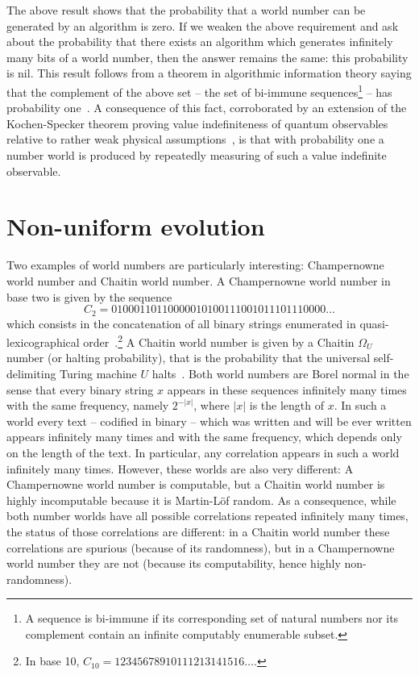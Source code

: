 \documentclass[12pt]{article}
\begin{document}
The above result shows that the probability that a world
number can be generated by an algorithm is zero.
If we weaken the  above requirement and ask about the probability that
there exists an algorithm which generates  infinitely many bits of a world number,
then the answer remains the same: this probability is nil.
This result follows from a theorem
in algorithmic information theory saying that the complement
of the above set -- the set of  bi-immune sequences\footnote{
A sequence  is bi-immune if  its corresponding set of natural numbers nor its complement contain an infinite computably enumerable subset.}
 --
has probability one~\cite{calude:02}. A consequence of this fact,
corroborated   by   an extension of the Kochen-Specker theorem
proving value indefiniteness of quantum observables
relative to rather weak physical assumptions~\cite{vi-aeverywhere-2014}, is that
with probability one a  number world is produced by repeatedly measuring of such a value indefinite observable.



\section{Non-uniform evolution}
\label{2018-was-sectnue}
 Two examples of world numbers are particularly interesting:  Champernowne world number and Chaitin world number. A Champernowne world number in base two is given by the sequence $$C_2=01000110110000010100111001011101110000\dots $$ which consists in the concatenation of all binary strings enumerated in quasi-lexicographical order~\cite{DGC1933}.\footnote{In base 10, $C_{10} = 12345678910111213141516\dots$.}  A Chaitin world number is given by a Chaitin $\Omega_U$ number (or halting probability),  that
is the probability that the universal self-delimiting Turing machine  $U$ halts~\cite{rtx100200236p}. Both
world numbers are Borel normal in the sense that every binary string $x$ appears in these sequences infinitely many times with the same frequency, namely
$2^{-|x|}$, where $|x|$ is the length of $x$.
 In such a world every text -- codified in binary -- which was written and will be ever written appears infinitely many times and with the same frequency,  which depends only on the length of the text. In particular, any correlation appears in such a world infinitely many times. However, these worlds are also very different: A Champernowne world number is computable, but a Chaitin world number is highly incomputable because it is Martin-L\"of random. As a consequence, while both number worlds  have all possible correlations repeated infinitely many times, the status of those correlations are different: in a Chaitin world number these correlations are spurious (because of its randomness), but in a Champernowne world number they are not (because  its  computability, hence highly non-randomness).
\end{document}
